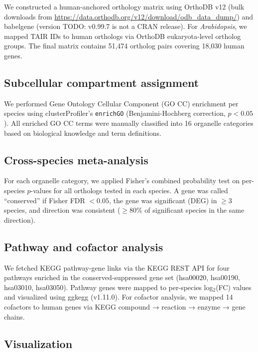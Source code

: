 \documentclass[11pt,a4paper]{article}
\begin{document}
We constructed a human-anchored orthology matrix using OrthoDB v12 (bulk downloads 
from \url{https://data.orthodb.org/v12/download/odb_data_dump/}) and babelgene 
(version TODO: v0.99.7 is not a CRAN release). For \textit{Arabidopsis}, we mapped TAIR IDs to human orthologs via 
OrthoDB eukaryota-level ortholog groups. The final matrix contains 51,474 
ortholog pairs covering 18,030 human genes.

\subsection{Subcellular compartment assignment}
\label{sec:methods:compartment}

We performed Gene Ontology Cellular Component (GO CC) enrichment per species using 
clusterProfiler's \texttt{enrichGO} (Benjamini-Hochberg correction, $p < 0.05$). 
All enriched GO CC terms were manually classified into 16 organelle categories based 
on biological knowledge and term definitions.

\subsection{Cross-species meta-analysis}
\label{sec:methods:meta}

For each organelle category, we applied Fisher's combined probability test on 
per-species $p$-values for all orthologs tested in each species. A gene was called 
``conserved'' if Fisher FDR $< 0.05$, the gene was significant (DEG) in $\geq 3$ 
species, and direction was consistent ($\geq 80\%$ of significant species in the 
same direction).

\subsection{Pathway and cofactor analysis}
\label{sec:methods:pathway}

We fetched KEGG pathway-gene links via the KEGG REST API for four pathways enriched 
in the conserved-suppressed gene set (hsa00020, hsa00190, hsa03010, hsa03050). 
Pathway genes were mapped to per-species log$_2$(FC) values and visualized using 
ggkegg (v1.11.0). For cofactor analysis, we mapped 14 cofactors to human genes via 
KEGG compound → reaction → enzyme → gene chains.

\subsection{Visualization}
\label{sec:methods:viz}
\end{document}
